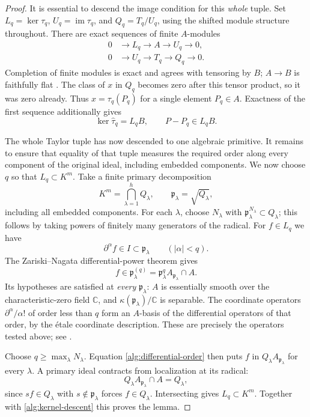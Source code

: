 \begin{proof}
It is essential to descend the image condition for this \emph{whole}
tuple. Set $L_q=\ker\tau_q$, $U_q=\operatorname{im}\tau_q$, and
$Q_q=T_q/U_q$, using the shifted module structure throughout.
There are exact sequences of finite $A$-modules
\begin{equation}
 \begin{split}
 0&\longrightarrow L_q\longrightarrow A\longrightarrow U_q
    \longrightarrow0,\\
 0&\longrightarrow U_q\longrightarrow T_q\longrightarrow Q_q
    \longrightarrow0.
 \end{split}
 \label{alg:descent-sequences}
\end{equation}
Completion of finite modules is exact and agrees with tensoring by $B$;
$A\to B$ is faithfully flat
\cite[Tags 00MA--00MC]{Stacks}. The class of $x$ in $Q_q$ becomes zero
after this tensor product, so it was zero already. Thus
$x=\tau_q(P_q)$ for a single element $P_q\in A$. Exactness of the first
sequence additionally gives
\begin{equation}
 \ker\widehat\tau_q=L_qB,\qquad P-P_q\in L_qB.
 \label{alg:kernel-descent}
\end{equation}

The whole Taylor tuple has now descended to one algebraic primitive.
It remains to ensure that equality of that tuple measures the required
order along every component of the original ideal, including embedded
components. We now choose $q$ so that $L_q\subset K^m$. Take a finite primary
decomposition
\[
 K^m=\bigcap_{\lambda=1}^h Q_\lambda,\qquad
 \mathfrak p_\lambda=\sqrt{Q_\lambda},
\]
including all embedded components. For each $\lambda$, choose
$N_\lambda$ with
$\mathfrak p_\lambda^{N_\lambda}\subset Q_\lambda$; this follows by
taking powers of finitely many generators of the radical. For
$f\in L_q$ we have
\[
 \partial^\alpha f\in I\subset\mathfrak p_\lambda
 \qquad(|\alpha|<q).
\]
The Zariski--Nagata differential-power theorem gives
\begin{equation}
 f\in\mathfrak p_\lambda^{(q)}
   =\mathfrak p_\lambda^qA_{\mathfrak p_\lambda}\cap A.
 \label{alg:differential-order}
\end{equation}
Its hypotheses are satisfied at \emph{every} $\mathfrak p_\lambda$:
$A$ is essentially smooth over the characteristic-zero field
$\mathbb C$, and $\kappa(\mathfrak p_\lambda)/\mathbb C$ is separable.
The coordinate operators $\partial^\alpha/\alpha!$ of order less than
$q$ form an $A$-basis of the differential operators of that order, by
the \'etale coordinate description. These are precisely the
operators tested above; see
\cite[Theorem 3.6 and Lemma 2.3]{DSGJ2020}.

Choose $q\geq\max_\lambda N_\lambda$. Equation
\eqref{alg:differential-order} then puts $f$ in
$Q_\lambda A_{\mathfrak p_\lambda}$ for every $\lambda$. A primary
ideal contracts from localization at its radical:
\[
 Q_\lambda A_{\mathfrak p_\lambda}\cap A=Q_\lambda,
\]
since $sf\in Q_\lambda$ with $s\notin\mathfrak p_\lambda$ forces
$f\in Q_\lambda$. Intersecting gives $L_q\subset K^m$.
Together with \eqref{alg:kernel-descent} this proves the lemma.
\end{proof}

